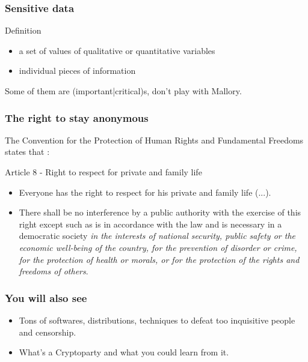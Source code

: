 \begin{frame}
\frametitle{Sensitive data}
\begin{block}{Definition}
\begin{itemize}
\item a set of values of qualitative or quantitative variables
\item individual pieces of information
\end{itemize}
\end{block}
Some of them are (important|critical)s, don't play with Mallory.
\end{frame}
\begin{frame}
\frametitle{The right to stay anonymous}
The Convention for the Protection of Human Rights and Fundamental Freedoms states
that :
\begin{block}{Article 8 - Right to respect for private and family life}
\begin{itemize}
\item Everyone has the right to respect for his private and family life (...).
\item  There shall be no interference by a public authority with the exercise
of this right except such as is in accordance with the law and is necessary in
a democratic society \emph{in the interests of national security, public safety or
the economic well-being of the country, for the prevention of disorder or crime,
for the protection of health or morals, or for the protection of the rights and
freedoms of others}.
\end{itemize}
\end{block}
\end{frame}
\begin{frame}
\frametitle{You will also see}
\begin{itemize}
\item Tons of softwares, distributions, techniques to defeat too inquisitive
people and censorship.
\item What's a Cryptoparty and what you could learn from it.
\end{itemize}
\end{frame}

